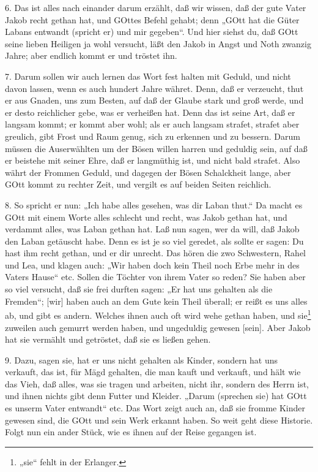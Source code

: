 6. Das ist alles nach einander darum erzählt, daß wir wissen, daß der gute Vater Jakob recht gethan hat, und GOttes Befehl gehabt; denn „GOtt hat die Güter Labans entwandt (spricht er) und mir gegeben“. Und hier siehst du, daß GOtt seine lieben Heiligen ja wohl versucht, läßt den Jakob in Angst und Noth zwanzig Jahre; aber endlich kommt er und tröstet ihn.

7. Darum sollen wir auch lernen das Wort fest halten mit Geduld, und nicht davon lassen, wenn es auch hundert Jahre währet. Denn, daß er verzeucht, thut er aus Gnaden, uns zum Besten, auf daß der Glaube stark und groß werde, und er desto reichlicher gebe, was er verheißen hat. Denn das ist seine Art, daß er langsam kommt; er kommt aber wohl; als er auch langsam strafet, strafet aber greulich, gibt Frost und Raum genug, sich zu erkennen und zu bessern. Darum müssen die Auserwählten um der Bösen willen harren und geduldig sein, auf daß er beistehe mit seiner Ehre, daß er langmüthig ist, und nicht bald strafet. Also währt der Frommen Geduld, und dagegen der Bösen Schalckheit lange, aber GOtt kommt zu rechter Zeit, und vergilt es auf beiden Seiten reichlich.

8. So spricht er nun: „Ich habe alles gesehen, was dir Laban thut.“ Da macht es GOtt mit einem Worte alles schlecht und recht, was Jakob gethan hat, und verdammt alles, was Laban gethan hat. Laß nun sagen, wer da will, daß Jakob den Laban getäuscht habe. Denn es ist je so viel geredet, als sollte er sagen: Du hast ihm recht gethan, und er dir unrecht. Das hören die zwo Schwestern, Rahel und Lea, und klagen auch: „Wir haben doch kein Theil noch Erbe mehr in des Vaters Hause“ etc. Sollen die Töchter von ihrem Vater so reden? Sie haben aber so viel versucht, daß sie frei durften sagen: „Er hat uns gehalten als die Fremden“; [wir] haben auch an dem Gute kein Theil überall; er reißt es uns alles ab, und gibt es andern. Welches ihnen auch oft wird wehe gethan haben, und sie\footnote{„sie“ fehlt in der Erlanger.} zuweilen auch gemurrt werden haben, und ungeduldig gewesen [sein]. Aber Jakob hat sie vermählt und getröstet, daß sie es ließen gehen.

9. Dazu, sagen sie, hat er uns nicht gehalten als Kinder, sondern hat uns verkauft, das ist, für Mägd gehalten, die man kauft und verkauft, und hält wie das Vieh, daß alles, was sie tragen und arbeiten, nicht ihr, sondern des Herrn ist, und ihnen nichts gibt denn Futter und Kleider. „Darum (sprechen sie) hat GOtt es unserm Vater entwandt“ etc. Das Wort zeigt auch an, daß sie fromme Kinder gewesen sind, die GOtt und sein Werk erkannt haben. So weit geht diese Historie. Folgt nun ein ander Stück, wie es ihnen auf der Reise gegangen ist.

